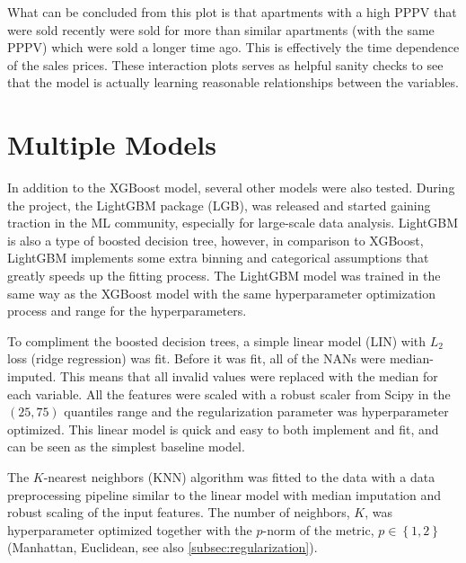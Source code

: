 What can be concluded from this plot is that apartments with a high PPPV that were sold recently were sold for more than similar apartments (with the same PPPV) which were sold a longer time ago. This is effectively the time dependence of the sales prices. These interaction plots serves as helpful sanity checks to see that the model is actually learning reasonable relationships between the variables. 

\FloatBarrier
\section{Multiple Models}
\label{sec:h:multiple_models}

In addition to the XGBoost model, several other models were also tested. During the project, the LightGBM package \autocite{keLightGBMHighlyEfficient2017} (LGB), was released and started gaining traction in the ML community, especially for large-scale data analysis. LightGBM is also a type of boosted decision tree, however, in comparison to XGBoost, LightGBM implements some extra binning and categorical assumptions that greatly speeds up the fitting process. The LightGBM model was trained in the same way as the XGBoost model with the same hyperparameter optimization process and range for the hyperparameters. 

To compliment the boosted decision trees, a simple linear model (LIN) with $L_2$ loss (ridge regression) was fit. Before it was fit, all of the NANs were median-imputed. This means that all invalid values were replaced with the median for each variable. All the features were scaled with a robust scaler from Scipy \autocite{virtanenSciPyFundamentalAlgorithms2019} in the $(25, 75)$ quantiles range and the regularization parameter was hyperparameter optimized. This linear model is quick and easy to both implement and fit, and can be seen as the simplest baseline model.

The $K$-nearest neighbors (KNN) algorithm was fitted to the data with a data preprocessing pipeline similar to the linear model with median imputation and robust scaling of the input features. The number of neighbors, $K$, was hyperparameter optimized together with the $p$-norm of the metric, $p \in \left\{ 1, 2\right\}$ (Manhattan, Euclidean, see also \autoref{subsec:regularization}).

